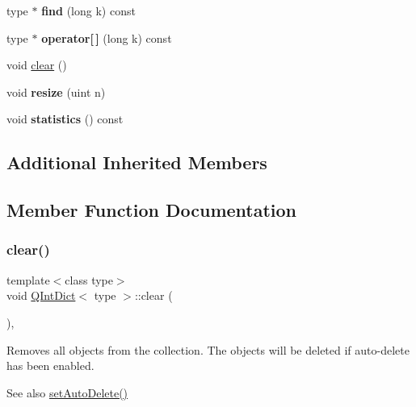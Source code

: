 \begin{DoxyCompactItemize}
type $\ast$ {\bfseries find} (long k) const
\item 
\mbox{\label{class_q_int_dict_ad3350419f03eb644e2b5216b2430bc3d}} 
type $\ast$ {\bfseries operator\mbox{[}$\,$\mbox{]}} (long k) const
\item 
void \mbox{\hyperlink{class_q_int_dict_a7cc8164a6c6865c52151920c428d13ed}{clear}} ()
\item 
\mbox{\label{class_q_int_dict_a08817cee21fcf121cd45ede3e5f36e69}} 
void {\bfseries resize} (uint n)
\item 
\mbox{\label{class_q_int_dict_a9483fd2d820470dd50e3ba2ec0186706}} 
void {\bfseries statistics} () const
\end{DoxyCompactItemize}
\subsection*{Additional Inherited Members}


\subsection{Member Function Documentation}
\mbox{\label{class_q_int_dict_a7cc8164a6c6865c52151920c428d13ed}} 
\subsubsection{\texorpdfstring{clear()}{clear()}}
{\footnotesize\ttfamily template$<$class type$>$ \\
void \mbox{\hyperlink{class_q_int_dict}{Q\+Int\+Dict}}$<$ type $>$\+::clear (\begin{DoxyParamCaption}{ }\end{DoxyParamCaption})\hspace{0.3cm}{\ttfamily [inline]}, {\ttfamily [virtual]}}

Removes all objects from the collection. The objects will be deleted if auto-\/delete has been enabled. \begin{DoxySeeAlso}{See also}
\mbox{\hyperlink{class_q_collection_a6ed41913c76bfba54be6da26015ee3f3}{set\+Auto\+Delete()}} 
\end{DoxySeeAlso}


